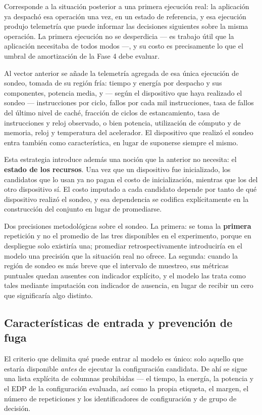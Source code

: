 \documentclass[12pt,oneside,spanish]{book}
\begin{document}
Corresponde a la situación posterior a una primera ejecución real: la aplicación ya despachó esa operación una vez, en un estado de referencia, y esa ejecución produjo telemetría que puede informar las decisiones siguientes sobre la misma operación. La primera ejecución no se desperdicia --- es trabajo útil que la aplicación necesitaba de todos modos ---, y su costo es precisamente lo que el umbral de amortización de la Fase 4 debe evaluar.

Al vector anterior se añade la telemetría agregada de esa única ejecución de sondeo, tomada de su región fría: tiempo y energía por despacho y sus componentes, potencia media, y --- según el dispositivo que haya realizado el sondeo --- instrucciones por ciclo, fallos por cada mil instrucciones, tasa de fallos del último nivel de caché, fracción de ciclos de estancamiento, tasa de instrucciones y reloj observado, o bien potencia, utilización de cómputo y de memoria, reloj y temperatura del acelerador. El dispositivo que realizó el sondeo entra también como característica, en lugar de suponerse siempre el mismo.

Esta estrategia introduce además una noción que la anterior no necesita: el \textbf{estado de los recursos}. Una vez que un dispositivo fue inicializado, los candidatos que lo usan ya no pagan el costo de inicialización, mientras que los del otro dispositivo sí. El costo imputado a cada candidato depende por tanto de qué dispositivo realizó el sondeo, y esa dependencia se codifica explícitamente en la construcción del conjunto en lugar de promediarse.

Dos precisiones metodológicas sobre el sondeo. La primera: se toma la \textbf{primera} repetición y no el promedio de las tres disponibles en el experimento, porque en despliegue solo existiría una; promediar retrospectivamente introduciría en el modelo una precisión que la situación real no ofrece. La segunda: cuando la región de sondeo es más breve que el intervalo de muestreo, sus métricas puntuales quedan ausentes con indicador explícito, y el modelo las trata como tales mediante imputación con indicador de ausencia, en lugar de recibir un cero que significaría algo distinto.

\subsection{Características de entrada y prevención de fuga}
\label{sec:fase2-features}

El criterio que delimita qué puede entrar al modelo es único: solo aquello que estaría disponible \textit{antes} de ejecutar la configuración candidata. De ahí se sigue una lista explícita de columnas prohibidas --- el tiempo, la energía, la potencia y el EDP de la configuración evaluada, así como la propia etiqueta, el margen, el número de repeticiones y los identificadores de configuración y de grupo de decisión.
\end{document}
